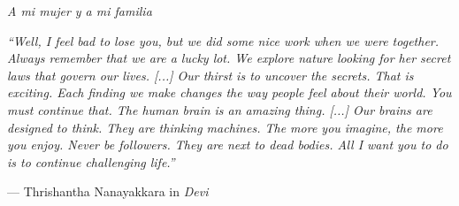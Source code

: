 \begin{flushright}
\emph{A mi mujer y a mi familia}
\\[12cm]
\end{flushright}
\setlength{\epigraphwidth}{11cm}
\setlength{\epigraphrule}{0pt}
\epigraph{\textit{``Well, I feel bad to lose you, but we did some nice work when we were together. Always remember that we are a lucky lot. We explore nature looking for her secret laws that govern our lives. [...] Our thirst is to uncover the secrets. That is exciting. Each finding we make changes the way people feel about their world. You must continue that. The human brain is an amazing thing. [...] Our brains are designed to  think. They are thinking machines. The more you imagine, the more you enjoy. Never be followers. They are next to dead bodies. All I want you to do is to continue challenging life.''}}{--- \textup{Thrishantha Nanayakkara in \textit{Devi}}}




